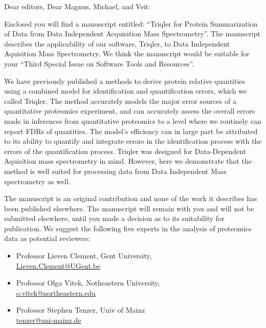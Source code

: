 \documentclass[a4paper]{letter}
\begin{document}
\begin{letter}{}
\vspace*{-5.0cm}

\opening{Dear editors, Dear Magnus, Michael, and Veit:}

Enclosed you will find a manuscript entitled: 
``Triqler for Protein Summarization of Data from Data Independent Acquisition Mass Spectrometry''. 
The manuscript describes the applicability of our software, Triqler, to Data Independent Aquisition Mass Spectrometry. We think the manuscript would be suitable for
your ``Third Special Issue on Software Tools and Resources''. 

We have previously published a methods to derive protein relative quantities 
using a combined model for identification and quantification
errors, which we called Triqler. 
The method accurately models the major error sources of a
quantitative proteomics experiment, and can accurately assess the overall errors
made in inferences from quantitative proteomics to a level where we routinely
can report FDRs of quantities. The model's efficiency can in large part be
attributed to its ability to quantify and integrate errors in the identification
process with the errors of the quantification process.
Triqler was designed for Data-Dependent Aquisition mass spectrometry in mind. 
However, here we demonstrate that the method is well suited for processing data from Data Independent Mass spectrometry as well. 
 
The manuscript is an original contribution and none of the work it
describes has been published elsewhere. The manuscript will
remain with you and will not be submitted elsewhere, until you made a
decision as to its suitability for publication.
We suggest the following five experts in the analysis of proteomics
data as potential reviewers:

\begin{itemize}

\item Professor Lieven Clement, Gent University, \\
\url{Lieven.Clement@UGent.be}

\item Professor Olga Vitek, Notheastern University, \\
\url{o.vitek@northeastern.edu}

\item Professor Stephen Tenzer, Univ of Mainz\\
\url{tenzer@uni-mainz.de}


\end{itemize}
\end{letter}
\end{document}

